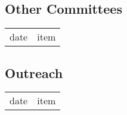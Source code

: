 \subsection{Other Committees}
\begin{tabular}[l]{ p{} p{} }
date & item\\
\end{tabular} 


\subsection{Outreach}
\begin{tabular}[l]{ p{} p{} }
date & item\\
\end{tabular} 